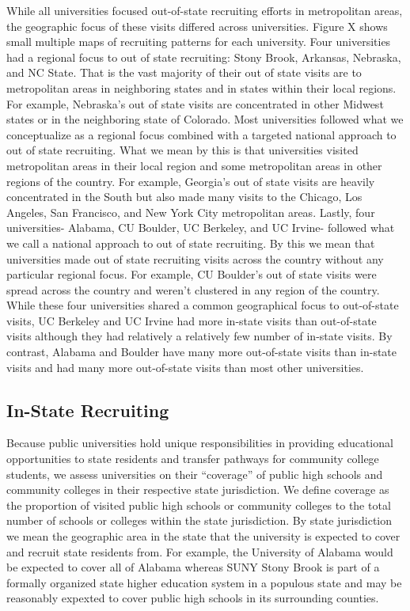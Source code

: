 \documentclass[twoside]{article}
\begin{document}
While all universities focused out-of-state recruiting efforts in metropolitan areas, the geographic focus of these visits differed across universities. Figure X shows small multiple maps of recruiting patterns for each university. Four universities had a regional focus to out of state recruiting: Stony Brook, Arkansas, Nebraska, and NC State. That is the vast majority of their out of state visits are to metropolitan areas in neighboring states and in states within their local regions. For example, Nebraska's out of state visits are concentrated in other Midwest states or in the neighboring state of Colorado. Most universities followed what we conceptualize as a regional focus combined with a targeted national approach to out of state recruiting. What we mean by this is that universities visited metropolitan areas in their local region and some metropolitan areas in other regions of the country. For example, Georgia's out of state visits are heavily concentrated in the South but also made many visits to the Chicago, Los Angeles, San Francisco, and New York City metropolitan areas. Lastly, four universities- Alabama, CU Boulder, UC Berkeley, and UC Irvine- followed what we call a national approach to out of state recruiting. By this we mean that universities made out of state recruiting visits across the country without any particular regional focus. For example, CU Boulder's out of state visits were spread across the country and weren't clustered in any region of the country.  While these four universities shared a common geographical focus to out-of-state visits, UC Berkeley and UC Irvine had more in-state visits than out-of-state visits although they had relatively a relatively few number of in-state visits. By contrast, Alabama and Boulder have many more out-of-state visits than in-state visits and had many more out-of-state visits than most other universities. 

\subsection*{In-State Recruiting}
Because public universities hold unique responsibilities in providing educational opportunities to state residents and transfer pathways for community college students, we assess universities on their “coverage” of public high schools and community colleges in their respective state jurisdiction. We define coverage as the proportion of visited public high schools or community colleges to the total number of schools or colleges within the state jurisdiction. By state jurisdiction we mean the geographic area in the state that the university is expected to cover and recruit state residents from. For example, the University of Alabama would be expected to cover all of Alabama whereas SUNY Stony Brook is part of a formally organized state higher education system in a populous state and may be reasonably expexted to cover public high schools in its surrounding counties.
\end{document}
